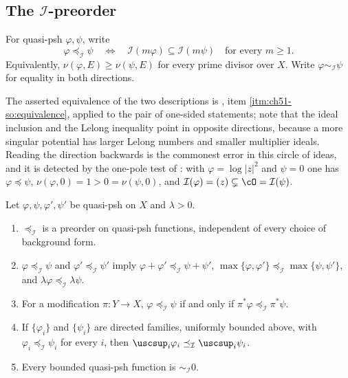 \subsection{The \texorpdfstring{\(\mathcal I\)}{I}-preorder}
\label{sec:ch51-i-preorder}

\begin{definition}
\label{def:complex-i-preorder}
For quasi-psh \(\varphi,\psi\), write
\[
 \varphi\preceq_{\mathcal I}\psi
 \quad\Longleftrightarrow\quad
 \mathcal I(m\varphi)\subseteq\mathcal I(m\psi)
 \quad\text{for every }m\geq1.
\tag{51.26}\label{eq:complex-i-preorder}
\]
Equivalently, \(\nu(\varphi,E)\geq\nu(\psi,E)\) for every prime divisor
over \(X\).  Write \(\varphi\sim_{\mathcal I}\psi\) for equality in both
directions.
\end{definition}

The asserted equivalence of the two descriptions is
, item
\cref{itm:ch51-so:equivalence}, applied to the pair of one-sided
statements; note that the ideal inclusion and the Lelong inequality point
in opposite directions, because a more singular potential has larger
Lelong numbers and smaller multiplier ideals.  Reading the direction
backwards is the commonest error in this circle of ideas, and it is
detected by the one-pole test of : with
\(\varphi=\log|z|^2\) and \(\psi=0\) one has
\(\varphi\preceq\psi\), \(\nu(\varphi,0)=1>0=\nu(\psi,0)\), and
\(\mathcal I(\varphi)=(z)\subsetneq\cO=\mathcal I(\psi)\).

\begin{proposition}
\label{prop:ch51-i-calculus}
Let \(\varphi,\psi,\varphi',\psi'\) be quasi-psh on \(X\) and
\(\lambda>0\).
\begin{enumerate}
\item\label{itm:ch51-ic:preorder}
      \(\preceq_{\mathcal I}\) is a preorder on quasi-psh functions,
      independent of every choice of background form.
\item\label{itm:ch51-ic:sum}
      \(\varphi\preceq_{\mathcal I}\psi\) and
      \(\varphi'\preceq_{\mathcal I}\psi'\) imply
      \(\varphi+\varphi'\preceq_{\mathcal I}\psi+\psi'\),
      \(\max\{\varphi,\varphi'\}\preceq_{\mathcal I}
      \max\{\psi,\psi'\}\), and
      \(\lambda\varphi\preceq_{\mathcal I}\lambda\psi\).
\item\label{itm:ch51-ic:pullback}
      For a modification \(\pi:Y\to X\),
      \(\varphi\preceq_{\mathcal I}\psi\) if and only if
      \(\pi^*\varphi\preceq_{\mathcal I}\pi^*\psi\).
\item\label{itm:ch51-ic:increasing}
      If \(\{\varphi_i\}\) and \(\{\psi_i\}\) are directed families,
      uniformly bounded above, with
      \(\varphi_i\preceq_{\mathcal I}\psi_i\) for every \(i\), then
      \(\uscsup_i\varphi_i\preceq_{\mathcal I}\uscsup_i\psi_i\).
\item\label{itm:ch51-ic:bounded}
      Every bounded quasi-psh function is \(\sim_{\mathcal I}0\).
\end{enumerate}
\end{proposition}

